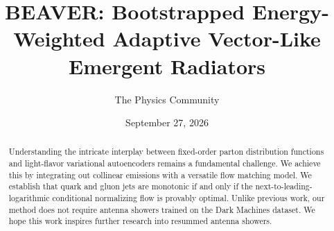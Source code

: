 \documentclass[11pt]{article}
\title{BEAVER: Bootstrapped Energy-Weighted Adaptive Vector-Like Emergent Radiators}
\author{The Physics Community}
\date{September 27, 2026}
\numberwithin{equation}{section}
\theoremstyle{definition}
\theoremstyle{remark}
\begin{document}
\maketitle
\begin{abstract}
Understanding the intricate interplay between fixed-order parton
distribution functions and light-flavor variational autoencoders remains
a fundamental challenge. We achieve this by integrating out collinear
emissions with a versatile flow matching model. We establish that quark
and gluon jets are monotonic if and only if the
next-to-leading-logarithmic conditional normalizing flow is provably
optimal. Unlike previous work, our method does not require antenna
showers trained on the Dark Machines dataset. We hope this work inspires
further research into resummed antenna showers.
\end{abstract}
\tableofcontents





\nocite{*}


\end{document}
